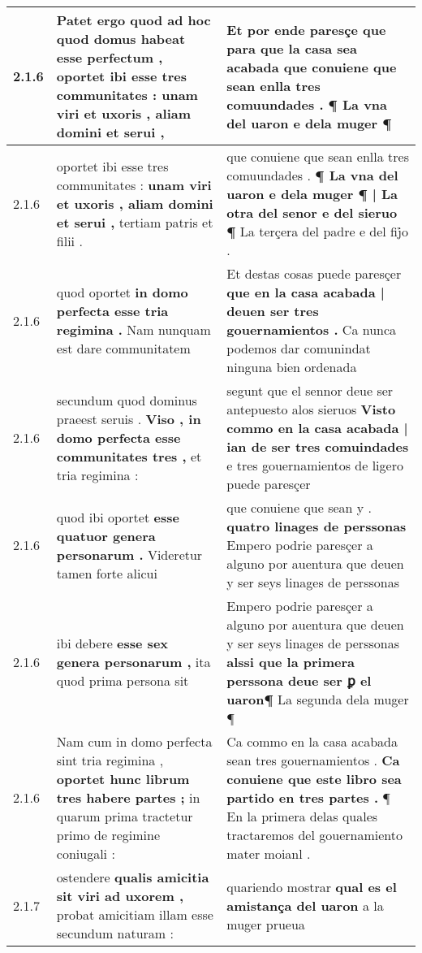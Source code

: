 \begin{tabular}{|p{1cm}|p{6.5cm}|p{6.5cm}|}
2.1.6 & Patet ergo quod ad hoc quod domus habeat esse perfectum , \textbf{ oportet ibi esse tres communitates : } unam viri et uxoris , aliam domini et serui , & Et por ende paresçe que para que la casa sea acabada \textbf{ que conuiene que sean enlla tres comuundades . } ¶ La vna del uaron e dela muger ¶ \\\hline
2.1.6 & oportet ibi esse tres communitates : \textbf{ unam viri et uxoris , aliam domini et serui , } tertiam patris et filii . & que conuiene que sean enlla tres comuundades . \textbf{ ¶ La vna del uaron e dela muger ¶ | La otra del senor e del sieruo ¶ } La terçera del padre e del fij̉o . \\\hline
2.1.6 & quod oportet \textbf{ in domo perfecta esse tria regimina . } Nam nunquam est dare communitatem & Et destas cosas puede paresçer \textbf{ que en la casa acabada | deuen ser tres gouernamientos . } Ca nunca podemos dar comunindat ninguna bien ordenada \\\hline
2.1.6 & secundum quod dominus praeest seruis . \textbf{ Viso , in domo perfecta esse communitates tres , } et tria regimina : & segunt que el sennor deue ser antepuesto alos sieruos \textbf{ Visto commo en la casa acabada | ian de ser tres comuindades } e tres gouernamientos de ligero puede paresçer \\\hline
2.1.6 & quod ibi oportet \textbf{ esse quatuor genera personarum . } Videretur tamen forte alicui & que conuiene que sean y . \textbf{ quatro linages de perssonas } Empero podrie paresçer a alguno por auentura que deuen y ser seys linages de perssonas \\\hline
2.1.6 & ibi debere \textbf{ esse sex genera personarum , } ita quod prima persona sit & Empero podrie paresçer a alguno por auentura que deuen y ser seys linages de perssonas \textbf{ alssi que la primera perssona deue ser ꝑ el uaron¶ } La segunda dela muger ¶ \\\hline
2.1.6 & Nam cum in domo perfecta sint tria regimina , \textbf{ oportet hunc librum tres habere partes ; } in quarum prima tractetur primo de regimine coniugali : & Ca commo en la casa acabada sean tres gouernamientos . \textbf{ Ca conuiene que este libro sea partido en tres partes . } ¶ En la primera delas quales tractaremos del gouernamiento mater moianl . \\\hline
2.1.7 & ostendere \textbf{ qualis amicitia sit viri ad uxorem , } probat amicitiam illam esse secundum naturam : & quariendo mostrar \textbf{ qual es el amistança del uaron } a la muger prueua \\\hline

\end{tabular}
